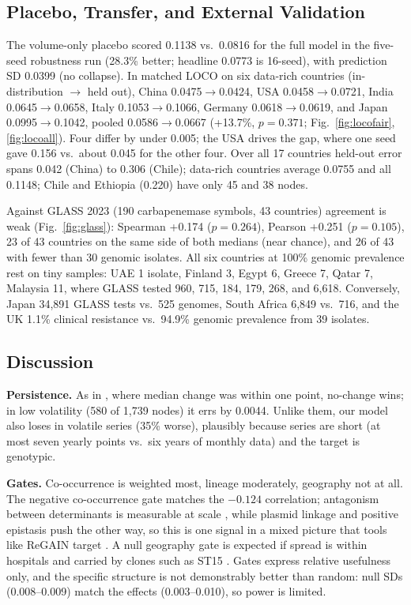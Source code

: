 \documentclass[journal]{IEEEtran}
\begin{document}
\subsection{Placebo, Transfer, and External Validation}
The volume-only placebo scored 0.1138 vs.\ 0.0816 for the full model in the five-seed robustness run (28.3\% better; headline 0.0773 is 16-seed), with prediction SD 0.0399 (no collapse). In matched LOCO on six data-rich countries (in-distribution $\to$ held out), China 0.0475$\to$0.0424, USA 0.0458$\to$0.0721, India 0.0645$\to$0.0658, Italy 0.1053$\to$0.1066, Germany 0.0618$\to$0.0619, and Japan 0.0995$\to$0.1042, pooled 0.0586$\to$0.0667 (+13.7\%, $p=0.371$; Fig.~\ref{fig:locofair}, \ref{fig:locoall}). Four differ by under 0.005; the USA drives the gap, where one seed gave 0.156 vs.\ about 0.045 for the other four. Over all 17 countries held-out error spans 0.042 (China) to 0.306 (Chile); data-rich countries average 0.0755 and all 0.1148; Chile and Ethiopia (0.220) have only 45 and 38 nodes.

Against GLASS 2023 \cite{ref4} (190 carbapenemase symbols, 43 countries) agreement is weak (Fig.~\ref{fig:glass}): Spearman +0.174 ($p=0.264$), Pearson +0.251 ($p=0.105$), 23 of 43 countries on the same side of both medians (near chance), and 26 of 43 with fewer than 30 genomic isolates. All six countries at 100\% genomic prevalence rest on tiny samples: UAE 1 isolate, Finland 3, Egypt 6, Greece 7, Qatar 7, Malaysia 11, where GLASS tested 960, 715, 184, 179, 268, and 6,618. Conversely, Japan 34,891 GLASS tests vs.\ 525 genomes, South Africa 6,849 vs.\ 716, and the UK 1.1\% clinical resistance vs.\ 94.9\% genomic prevalence from 39 isolates.


\subsection{Discussion}\label{sec:disc}
\textbf{Persistence.} As in \cite{ref17}, where median change was within one point, no-change wins; in low volatility (580 of 1,739 nodes) it errs by 0.0044. Unlike them, our model also loses in volatile series (35\% worse), plausibly because series are short (at most seven yearly points vs.\ six years of monthly data) and the target is genotypic.

\textbf{Gates.} Co-occurrence is weighted most, lineage moderately, geography not at all. The negative co-occurrence gate matches the $-0.124$ correlation; antagonism between determinants is measurable at scale \cite{ref14}, while plasmid linkage \cite{ref13} and positive epistasis \cite{ref15} push the other way, so this is one signal in a mixed picture that tools like ReGAIN target \cite{ref16}. A null geography gate is expected if spread is within hospitals \cite{ref10} and carried by clones such as ST15 \cite{ref11}. Gates express relative usefulness only, and the specific structure is not demonstrably better than random: null SDs (0.008--0.009) match the effects (0.003--0.010), so power is limited.
\end{document}
